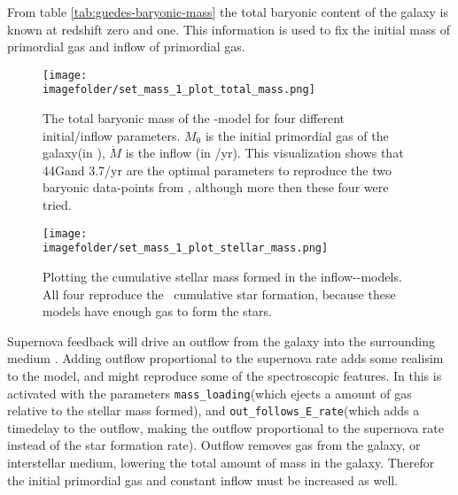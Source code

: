 
From table \ref{tab:guedes-baryonic-mass} the total baryonic content of the galaxy is known at redshift zero and one. This information is used to fix the initial mass of primordial gas and inflow of primordial gas. 


\begin{figure}[h]
  \centering
  \texttt{[image: \\imagefolder/set\_mass\_1\_plot\_total\_mass.png]}
  \caption{\label{fig:fit-v1-1-total}
    The total baryonic mass of the \omegamodel-model for four different initial/inflow parameters.
    $M_0$ is the initial primordial gas of the galaxy(in \msol), $\dot{M}$ is the inflow (in \msol/yr).
    This visualization shows that 44G\msol and 3.7\msol/yr are the optimal parameters to reproduce the two baryonic data-points from \eris, although more then these four were tried.
  }
\end{figure}
\begin{figure}[h]
  \centering
  \texttt{[image: \\imagefolder/set\_mass\_1\_plot\_stellar\_mass.png]}
  \caption{\label{fig:fit-v1-1-stellar}
    Plotting the cumulative stellar mass formed in the inflow-\omegamodel-models. All four reproduce the \eris\ cumulative star formation, because these models have enough gas to form the stars.
  }
\end{figure}

Supernova feedback will drive an outflow from the galaxy into the surrounding medium . Adding outflow proportional to the supernova rate adds some realisim to the model, and might reproduce some of the spectroscopic features.
In \omegamodel this is activated with the parameters \verb|mass_loading|(which ejects a amount of gas relative to the stellar mass formed), and \verb|out_follows_E_rate|(which adds a timedelay to the outflow, making the outflow proportional to the supernova rate instead of the star formation rate).
Outflow removes gas from the galaxy, or interstellar medium, lowering the total amount of mass in the galaxy. Therefor the initial primordial gas and constant inflow must be increased as well.


